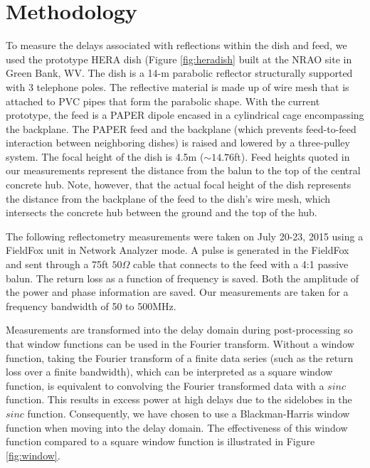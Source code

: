 \documentclass[12pt,preprint]{aastex}
\begin{document}
 
\section{Methodology}{\label{sec:methods}}

To measure the delays associated with reflections within the dish and feed, we
used the prototype HERA dish (Figure \ref{fig:heradish} built at the NRAO site in
Green Bank, WV. The dish is a 14-m parabolic reflector structurally supported
with 3 telephone poles. The reflective material is made up of wire mesh that
is attached to PVC pipes that form the parabolic shape. With the current
prototype, the feed is a PAPER dipole encased in a cylindrical cage encompassing
the backplane. The PAPER feed and the backplane (which prevents feed-to-feed
interaction between neighboring dishes) is raised and lowered by a three-pulley
system. The focal height of the dish is 4.5m ($\sim{14.76}$ft). Feed heights quoted in our measurements represent the distance from the balun to the top of the central concrete hub. Note, however, that the actual focal height of the dish represents the distance from the backplane of the feed to the dish's wire mesh, which intersects the concrete hub between the ground and the top of the hub. 

The following reflectometry measurements were taken on July 20-23, 2015 using a
FieldFox unit in Network Analyzer mode. A pulse is generated in the FieldFox
and sent through a 75ft $50\Omega$ cable that connects to the feed with a 4:1
passive balun. The return loss as a function of frequency is saved. Both
the amplitude of the power and phase information are saved. Our
measurements are taken for a frequency bandwidth of 50 to 500MHz. 

Measurements are transformed into the delay domain during post-processing so that window functions
can be used in the Fourier transform. Without a window function, taking the Fourier transform of a finite data series (such as the return loss over a finite bandwidth), which can be interpreted as a square window function, is equivalent to convolving the Fourier transformed data with a $sinc$ function. This results in excess power at high delays due to the sidelobes in the $sinc$ function. Consequently, we have chosen to use a Blackman-Harris window function when moving into the delay domain. The effectiveness of this window function compared to a square window function is illustrated in Figure \ref{fig:window}.
\end{document}
